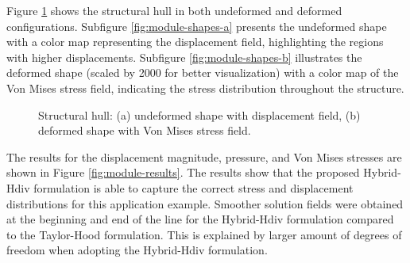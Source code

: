\documentclass[english,11pt,3p,number,sort&compress]{elsarticle}
\begin{document}
Figure \ref{fig:module-shapes} shows the structural hull in both undeformed and deformed configurations. Subfigure \ref{fig:module-shapes-a} presents the undeformed shape with a color map representing the displacement field, highlighting the regions with higher displacements. Subfigure \ref{fig:module-shapes-b} illustrates the deformed shape (scaled by 2000 for better visualization) with a color map of the Von Mises stress field, indicating the stress distribution throughout the structure.


\begin{figure}[H]
	\centering
	\hfill
	\caption{Structural hull: (a) undeformed shape with displacement field, (b) deformed shape with Von Mises stress field.}
	\label{fig:module-shapes}
\end{figure}

The results for the displacement magnitude, pressure, and Von Mises stresses are shown in Figure \ref{fig:module-results}. The results show that the proposed Hybrid-Hdiv formulation is able to capture the correct stress and displacement distributions for this application example. Smoother solution fields were obtained at the beginning and end of the line for the Hybrid-Hdiv formulation compared to the Taylor-Hood formulation. This is explained by larger amount of degrees of freedom when adopting the Hybrid-Hdiv formulation. 
\end{document}
